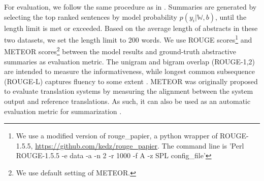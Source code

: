 \begin{table}[t!]
    \centering
    \caption{Results on the Pubmed dataset. 
    See caption of Table \ref{tab:result-arXiv} above for details on compared models and notation. 
    }
    \label{tab:result-pubmed}
\end{table} 
For evaluation, we follow the same procedure as in \cite{EMNLP2018}. Summaries are generated by selecting the top ranked sentences by model probability $p(y_i|\mathbb{W},b)$, until the length limit is met or exceeded. Based on the average length of abstracts in these two datasets, we set the length limit to 200 words. We use ROUGE scores\footnote{We use a modified version of rouge\_papier, a python wrapper of ROUGE-1.5.5, \url{https://github.com/kedz/rouge_papier}. The command line is 'Perl ROUGE-1.5.5 -e data -a -n 2 -r 1000 -f A -z SPL  config\_file'} \cite{ROUGE} and METEOR scores\footnote{We use default setting of METEOR.} \cite{meteor} between the model results and ground-truth abstractive summaries as evaluation metric. The unigram and bigram overlap (ROUGE-1,2) are intended to measure the informativeness, while longest common subsequence (ROUGE-L) captures fluency to some extent \cite{cheng&lapata}. METEOR was originally proposed to evaluate translation systems by measuring the alignment between the system output and reference translations. As such, it can also be used as an automatic evaluation metric for summarization \cite{EMNLP2018}.
